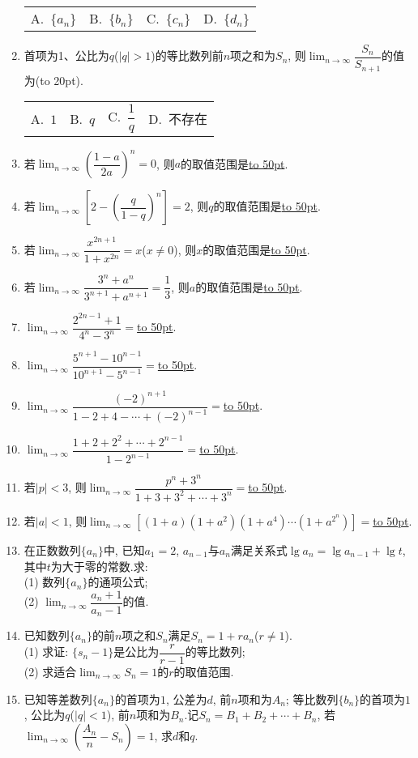 \documentclass[10pt,a4paper]{article}
\newcommand{\blank}[1]{\underline{\hbox to #1pt{}}}
\newcommand{\bracket}[1]{(\hbox to #1pt{})}
\newcommand{\fourch}[4]{\par\begin{tabular}{p{.23\textwidth}p{.23\textwidth}p{.23\textwidth}p{.23\textwidth}}
A.~#1 &B.~#2& C.~#3& D.~#4
\end{tabular}}
\begin{document}
\begin{enumerate}[1.]
\fourch{$\{a_n\}$}{$\{b_n\}$}{$\{c_n\}$}{$\{d_n\}$}
\item 首项为1、公比为$q$($|q|>1$)的等比数列前$n$项之和为$S_n$, 则$\displaystyle \lim_{n\to \infty} \dfrac{S_n}{{S_{n+1}}}$的值为\bracket{20}.
\fourch{$1$}{$q$}{$\dfrac 1q$}{不存在}
\item 若$\displaystyle \lim_{n\to \infty} (\dfrac{1-a}{2a})^n=0$, 则$a$的取值范围是\blank{50}.
\item 若$\displaystyle \lim_{n\to \infty} [2-(\dfrac q{1-q})^n]=2$, 则$q$的取值范围是\blank{50}.
\item 若$\displaystyle \lim_{n\to \infty} \dfrac{{x^{2n+1}}}{1+{x^{2n}}}=x$($x\ne 0$), 则$x$的取值范围是\blank{50}.
\item 若$\displaystyle \lim_{n\to \infty} \dfrac{{3^n}+{a^n}}{{3^{n+1}}+{a^{n+1}}}=\dfrac 13$, 则$a$的取值范围是\blank{50}.
\item $\displaystyle \lim_{n\to \infty} \dfrac{{2^{2n-1}}+1}{{4^n}-{3^n}}=$\blank{50}.
\item $\displaystyle \lim_{n\to \infty} \dfrac{{5^{n+1}}-{{10}^{n-1}}}{{{10}^{n+1}}-{5^{n-1}}}=$\blank{50}.
\item $\displaystyle \lim_{n\to \infty} \dfrac{{{(-2)}^{n+1}}}{1-2+4-\cdots +{{(-2)}^{n-1}}}=$\blank{50}.
\item $\displaystyle \lim_{n\to \infty} \dfrac{1+2+{2^2}+\cdots +{2^{n-1}}}{1-{2^{n-1}}}=$\blank{50}.
\item 若$|p|<3$, 则$\displaystyle \lim_{n\to \infty} \dfrac{{p^n}+{3^n}}{1+3+{3^2}+\cdots +{3^n}}=$\blank{50}.
\item 若$|a|<1$, 则$\displaystyle \lim_{n\to \infty} [(1+a)(1+a^2)(1+a^4)\cdots (1+a^{2^n})]=$\blank{50}.
\item 在正数数列$\{a_n\}$中, 已知$a_1=2$, $a_{n-1}$与$a_n$满足关系式$\lg a_n=\lg a_{n-1}+\lg t$, 其中$t$为大于零的常数.求:\\
(1) 数列$\{a_n\}$的通项公式;\\
(2) $\displaystyle \lim_{n\to \infty} \dfrac{{a_n}+1}{{a_n}-1}$的值.
\item 已知数列$\{a_n\}$的前$n$项之和$S_n$满足$S_n=1+ra_n$($r\ne 1$).\\
(1) 求证: $\{s_n-1\}$是公比为$\dfrac r{r-1}$的等比数列;\\
(2) 求适合$\displaystyle \lim_{n\to \infty} S_n=1$的$r$的取值范围.
\item 已知等差数列$\{a_n\}$的首项为$1$, 公差为$d$, 前$n$项和为$A_n$; 等比数列$\{b_n\}$的首项为$1$, 公比为$q$($|q|<1$), 前$n$项和为$B_n$.记$S_n=B_1+B_2+\cdots +B_n$, 若$\displaystyle \lim_{n\to \infty} (\dfrac{A_n}n-S_n)=1$, 求$d$和$q$.

\end{enumerate}
\end{document}
